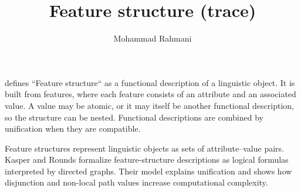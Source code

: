 \documentclass[a4paper]{article}
\title{Feature structure (trace)}
\date{}
\author{Mohammad Rahmani}
\begin{document}
    \maketitle
    \cite{kay-1984-functional-unification-grammar} defines ``Feature structure`` as a functional description of a linguistic object. It is built from features, where each feature consists of an attribute and an associated value. A value may be atomic, or it may itself be another functional description, so the structure can be nested. Functional descriptions are combined by unification when they are compatible.
    
    Feature structures \cite{kasper-1986-a-logical-semantics-for-feature-structures} represent linguistic objects as sets of attribute--value pairs. Kasper and Rounds formalize feature-structure descriptions as logical formulas interpreted by directed graphs.
    Their model explains unification and shows how disjunction and non-local path values increase computational complexity.
    

    
    
    
\end{document}
